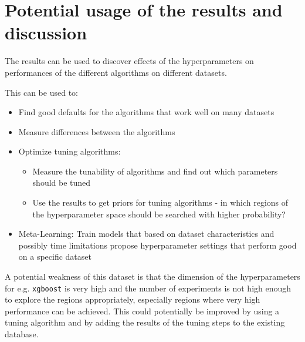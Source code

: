 \documentclass{article}
\begin{document}
\section{Potential usage of the results and discussion}

The results can be used to discover effects of the hyperparameters on performances 
of the different algorithms on different datasets. 

This can be used to:
\begin{itemize}
\item Find good defaults for the algorithms that work well on many datasets
\item Measure differences between the algorithms
\item Optimize tuning algorithms:
\begin{itemize}
\item Measure the tunability of algorithms and find out which parameters should be tuned \citep[see][]{Probst20182}
\item Use the results to get priors for tuning algorithms - in which regions of the 
hyperparameter space should be searched with higher probability?
\end{itemize}
\item Meta-Learning: Train models that based on dataset characteristics and 
possibly time limitations propose hyperparameter settings that perform good 
on a specific dataset
\end{itemize}

A potential weakness of this dataset is that the dimension of the hyperparameters for e.g. \texttt{xgboost} is very high and the number of experiments is not high enough to explore the regions appropriately, especially regions where very high performance can be achieved. This could potentially be improved by using a tuning algorithm and by adding the results of the tuning steps to the existing database. 



 
\end{document}
